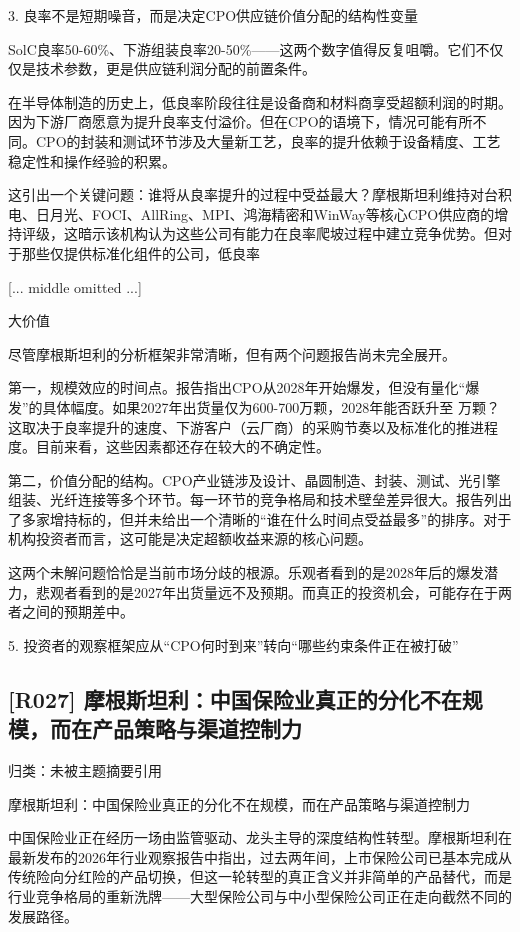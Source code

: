 \documentclass[11pt]{ctexart}
\begin{document}
3. 良率不是短期噪音，而是决定CPO供应链价值分配的结构性变量

SolC良率50-60\%、下游组装良率20-50\%——这两个数字值得反复咀嚼。它们不仅仅是技术参数，更是供应链利润分配的前置条件。

在半导体制造的历史上，低良率阶段往往是设备商和材料商享受超额利润的时期。因为下游厂商愿意为提升良率支付溢价。但在CPO的语境下，情况可能有所不同。CPO的封装和测试环节涉及大量新工艺，良率的提升依赖于设备精度、工艺稳定性和操作经验的积累。

这引出一个关键问题：谁将从良率提升的过程中受益最大？摩根斯坦利维持对台积电、日月光、FOCI、AllRing、MPI、鸿海精密和WinWay等核心CPO供应商的增持评级，这暗示该机构认为这些公司有能力在良率爬坡过程中建立竞争优势。但对于那些仅提供标准化组件的公司，低良率

[... middle omitted ...]

大价值

尽管摩根斯坦利的分析框架非常清晰，但有两个问题报告尚未完全展开。

第一，规模效应的时间点。报告指出CPO从2028年开始爆发，但没有量化“爆发”的具体幅度。如果2027年出货量仅为600-700万颗，2028年能否跃升至 万颗？这取决于良率提升的速度、下游客户（云厂商）的采购节奏以及标准化的推进程度。目前来看，这些因素都还存在较大的不确定性。

第二，价值分配的结构。CPO产业链涉及设计、晶圆制造、封装、测试、光引擎组装、光纤连接等多个环节。每一环节的竞争格局和技术壁垒差异很大。报告列出了多家增持标的，但并未给出一个清晰的“谁在什么时间点受益最多”的排序。对于机构投资者而言，这可能是决定超额收益来源的核心问题。

这两个未解问题恰恰是当前市场分歧的根源。乐观者看到的是2028年后的爆发潜力，悲观者看到的是2027年出货量远不及预期。而真正的投资机会，可能存在于两者之间的预期差中。

5. 投资者的观察框架应从“CPO何时到来”转向“哪些约束条件正在被打破”

\subsection{[R027] 摩根斯坦利：中国保险业真正的分化不在规模，而在产品策略与渠道控制力}
{\small\color{refgray}归类：未被主题摘要引用}

摩根斯坦利：中国保险业真正的分化不在规模，而在产品策略与渠道控制力

中国保险业正在经历一场由监管驱动、龙头主导的深度结构性转型。摩根斯坦利在最新发布的2026年行业观察报告中指出，过去两年间，上市保险公司已基本完成从传统险向分红险的产品切换，但这一轮转型的真正含义并非简单的产品替代，而是行业竞争格局的重新洗牌——大型保险公司与中小型保险公司正在走向截然不同的发展路径。
\end{document}
